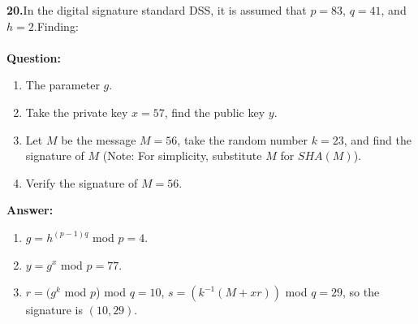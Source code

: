 \documentclass[paper=a4, fontsize=11pt]{scrartcl} %
\numberwithin{equation}{section} %
\numberwithin{figure}{section} %
\numberwithin{table}{section} %
\begin{document}
\textbf{20.}In the digital signature standard DSS, it is assumed that $p = 83$, $q = 41$, and$ h = 2$.Finding:
\\
\\
\textbf{Question:}
\begin{enumerate}
\item The parameter $g$.
\item Take the private key $x = 57$, find the public key $y$.
\item Let $M$ be the message $M = 56$, take the random number $k = 23$, and find the signature of $M$ (Note: For simplicity, substitute $M$ for $SHA(M)$).
\item Verify the signature of $M = 56$.
\end{enumerate}

\textbf{Answer:}
\begin{enumerate}
\item $g = h^{(p-1)q}$ mod $p = 4$.
\item $y = g^x$ mod $p = 77$.
\item $r = (g^k$ mod $p$) mod $q = 10$, $s = (k^{-1} (M + xr))$ mod $q = 29$, so the signature is $(10, 29)$.
\end{enumerate}
\end{document}

